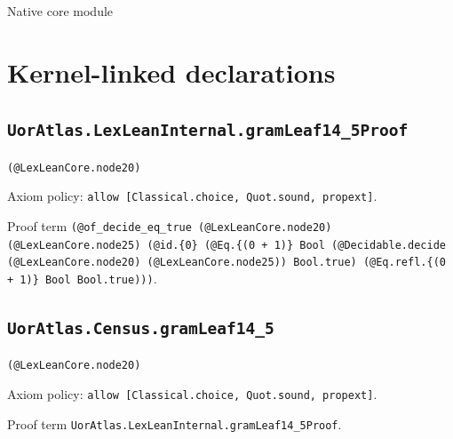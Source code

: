 \documentclass[11pt]{article}
\begin{document}
\begin{center}{\LARGE Native core module}\end{center}
\section*{Kernel-linked declarations}
\subsection*{\texttt{UorAtlas.LexLeanInternal.gramLeaf14\_5Proof}}
\noindent\texttt{(@LexLeanCore.node20)}\par
\noindent Axiom policy: \texttt{allow [Classical.choice, Quot.sound, propext]}.\par
\noindent Proof term \texttt{(@of\_decide\_eq\_true (@LexLeanCore.node20) (@LexLeanCore.node25) (@id.\{0\} (@Eq.\{(0 + 1)\} Bool (@Decidable.decide (@LexLeanCore.node20) (@LexLeanCore.node25)) Bool.true) (@Eq.refl.\{(0 + 1)\} Bool Bool.true)))}.\par
\subsection*{\texttt{UorAtlas.Census.gramLeaf14\_5}}
\noindent\texttt{(@LexLeanCore.node20)}\par
\noindent Axiom policy: \texttt{allow [Classical.choice, Quot.sound, propext]}.\par
\noindent Proof term \texttt{UorAtlas.LexLeanInternal.gramLeaf14\_5Proof}.\par
\end{document}
